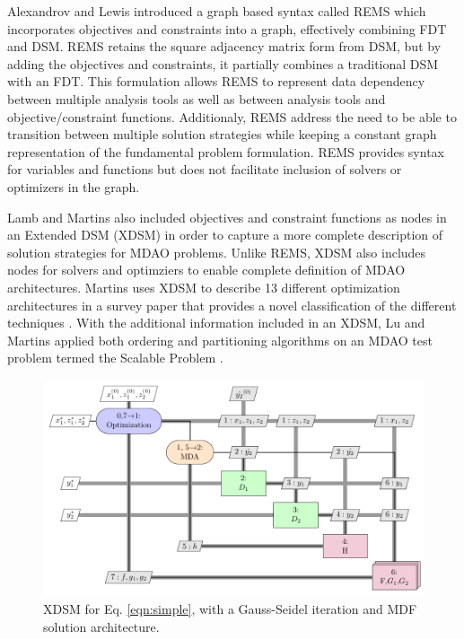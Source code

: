     Alexandrov and Lewis introduced a graph based syntax called REMS which 
    incorporates objectives and constraints into a graph, effectively combining 
    FDT and DSM\cite{alexandrov2004}. REMS retains the square adjacency 
    matrix form from DSM, but by adding the objectives and constraints, it partially 
    combines a traditional DSM with an FDT. This formulation allows REMS to represent data 
    dependency between multiple analysis tools as well as between analysis tools and
    objective/constraint functions. Additionaly, REMS address the need to be able to 
    transition between multiple solution strategies while keeping a constant 
    graph representation of the fundamental problem formulation. REMS provides
    syntax for variables and functions but does not facilitate inclusion 
    of solvers or optimizers in the graph. 

    Lamb and Martins also included objectives and constraint functions as nodes 
    in an Extended DSM (XDSM) in order to capture a more complete description 
    of solution strategies for MDAO problems\cite{Lambe2012}. Unlike REMS, 
    XDSM also includes nodes for solvers and optimziers to enable complete 
    definition of MDAO architectures. Martins uses XDSM to describe 13 different 
    optimization architectures in a survey paper that provides a novel 
    classification of the different techniques \cite{Lambe2011}. With the 
    additional information included in an XDSM, Lu and Martins applied both 
    ordering and partitioning algorithms on an MDAO test problem termed the 
    Scalable Problem \cite{Lu2012}. 

    \begin{figure}
        \begin{center}
        \includegraphics[height=.25\textheight]{XDSM/simple}
        \caption{XDSM for Eq. \ref{eqn:simple}, with a Gauss-Seidel iteration 
          and MDF solution architecture. \label{fig:XDSM_simple}}
        \end{center}
    \end{figure}


